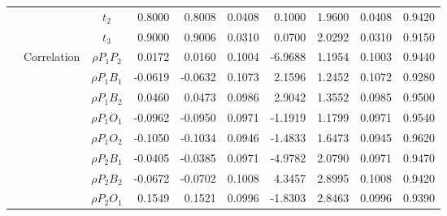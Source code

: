 \documentclass[letterpaper]{article}
\begin{document}
\begin{table}[h]
\begin{tabular}{cccrrrrrrr}
            &             & $t_2$          & 0.8000                 & 0.8008                 & 0.0408                 & 0.1000                 & 1.9600                 & 0.0408                   & 0.9420                 \\
            &             & $t_3$          & 0.9000                 & 0.9006                 & 0.0310                 & 0.0700                 & 2.0292                 & 0.0310                   & 0.9150                 \\
            & Correlation & $\rho{P_1P_2}$ & 0.0172                 & 0.0160                 & 0.1004                 & -6.9688                & 1.1954                 & 0.1003                   & 0.9440                 \\
            &             & $\rho{P_1B_1}$ & -0.0619                & -0.0632                & 0.1073                 & 2.1596                 & 1.2452                 & 0.1072                   & 0.9280                 \\
            &             & $\rho{P_1B_2}$ & 0.0460                 & 0.0473                 & 0.0986                 & 2.9042                 & 1.3552                 & 0.0985                   & 0.9500                 \\
            &             & $\rho{P_1O_1}$ & -0.0962                & -0.0950                & 0.0971                 & -1.1919                & 1.1799                 & 0.0971                   & 0.9540                 \\
            &             & $\rho{P_1O_2}$ & -0.1050                & -0.1034                & 0.0946                 & -1.4833                & 1.6473                 & 0.0945                   & 0.9620                 \\
            &             & $\rho{P_2B_1}$ & -0.0405                & -0.0385                & 0.0971                 & -4.9782                & 2.0790                 & 0.0971                   & 0.9470                 \\
            &             & $\rho{P_2B_2}$ & -0.0672                & -0.0702                & 0.1008                 & 4.3457                 & 2.8995                 & 0.1008                   & 0.9420                 \\
            &             & $\rho{P_2O_1}$ & 0.1549                 & 0.1521                 & 0.0996                 & -1.8303                & 2.8463                 & 0.0996                   & 0.9390                 \\

\end{tabular}
\end{table}
\end{document}
